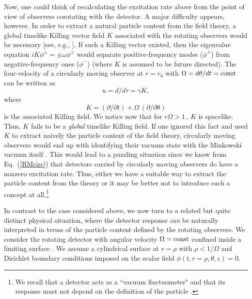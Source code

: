 \documentclass[12pt,nofootinbib,floatfix,aps,prd,showpacs,amsmath,amssymb,eqsecnum]{revtex4-2}
\let\cite\citep
\begin{document}
Now, one could think of recalculating the excitation rate above
from the point of view of observers corotating with the detector.
A major difficulty appears, however.
In order to extract a natural particle content from the field 
theory, a global timelike Killing vector field $K$ 
associated with the rotating observers would be necessary 
[see, e.g., \textcite{WaldQFTCS}]. If such a Killing vector existed, then
the eigenvalue equation $
i K \phi^{\pm} = \pm \omega \phi^{\pm}
$
would separate positive-frequency modes ($\phi^+$) from
negative-frequency ones ($\phi^-$) 
(where $K$ is assumed to be future directed). 
The four-velocity of a circularly moving observer 
at $r=r_0$ with $\Omega = d\theta/dt =  {\rm const}$  can be written
as 
$$
u = d/d\tau = \gamma K,
$$
where
\begin{equation}
    K = ({\partial}/{\partial t}) + 
    \Omega \, ({\partial}/{\partial \theta})
\label{rot vector}
\end{equation}
is the associated Killing field. 
We notice now that for $r\Omega> 1\,$, $K$ is spacelike.
Thus, $K$ fails to be a {\em global} timelike Killing field.
If one ignored this fact and used $K$ to extract naively 
the particle content of the field theory, circularly moving 
observers would end up with identifying their vacuum state 
with the Minkowski vacuum itself \cite{Letawetal80}. 
This would lead to a puzzling situation since we know from
Eq.~(\ref{RMcirc}) that detectors carried by circularly moving 
observers do have a nonzero excitation rate.
Thus, either we have a suitable way to extract
the particle content from the theory \cite{Ashtekaretal75,Kay78} or 
it may be better not to introduce such a concept at 
all.\footnote{We recall that a detector acts as a ``vacuum fluctuometer" 
and that its response must not depend on the definition of the
particle \cite{Groveetal83}.}

In contrast to the case considered above, we now turn to a 
related but quite distinct physical situation, where the detector 
response {\em can} be naturally interpreted in terms of the 
particle content defined by the rotating observers. We consider the 
rotating detector with angular velocity $\Omega = {\rm const}$ 
confined inside a limiting surface \cite{Levinetal93, Daviesetal96}.
We assume a cylindrical surface at $r=\rho$ with $\rho < 1/\Omega $
and Dirichlet boundary conditions imposed on the scalar field 
$
\phi (t, r=\rho, \theta, z)= 0.
$
\end{document}
